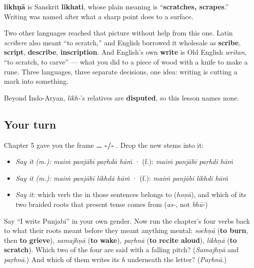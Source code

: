 \begin{cousinweb}
\textbf{likhṇā} is Sanskrit \textbf{likhati}, whose plain meaning is “\textbf{scratches, scrapes}.” Writing was named after what a sharp point does to a surface.

Two other languages reached that picture without help from this one. Latin \emph{scrībere} also meant “to scratch,” and English borrowed it wholesale as \textbf{scribe}, \textbf{script}, \textbf{describe}, \textbf{inscription}. And English's own \textbf{write} is Old English \emph{wrītan}, “to scratch, to carve” — what you did to a piece of wood with a knife to make a rune. Three languages, three separate decisions, one idea: writing is cutting a mark into something.

Beyond Indo-Aryan, \emph{likh-}'s relatives are \textbf{disputed}, so this lesson names none.
\end{cousinweb}

\subsection*{Your turn}
Chapter 5 gave you the frame \textbf{ … -/- }. Drop the new stems into it:

\begin{itemize}
\raggedright
  \item \emph{Say it (m.):} \emph{maiṁ panjābī paṛhdā hāṁ} · (f.): \emph{maiṁ panjābī paṛhdī hāṁ}
  \item \emph{Say it (m.):} \emph{maiṁ panjābī likhdā hāṁ} · (f.): \emph{maiṁ panjābī likhdī hāṁ}
  \item \emph{Say it:} which verb the \textbf{} in those sentences belongs to (\emph{hoṇā}), and which of its two braided roots that present tense comes from (\emph{as-}, not \emph{bhū-})
\end{itemize}

\begin{tcolorbox}[breakable,colback=teal!4,colframe=teal!35!black,title={Before you move on}]
Say “I write Punjabi” in your own gender. Now run the chapter's four verbs back to what their roots meant before they meant anything mental: \emph{sochṇā} (\textbf{to burn}, then \textbf{to grieve}), \emph{samajhṇā} (\textbf{to wake}), \emph{paṛhnā} (\textbf{to recite aloud}), \emph{likhṇā} (\textbf{to scratch}). Which two of the four are said with a falling pitch? (\emph{Samajhṇā} and \emph{paṛhnā}.) And which of them writes its \emph{h} underneath the letter? (\emph{Paṛhnā}.)
\end{tcolorbox}
